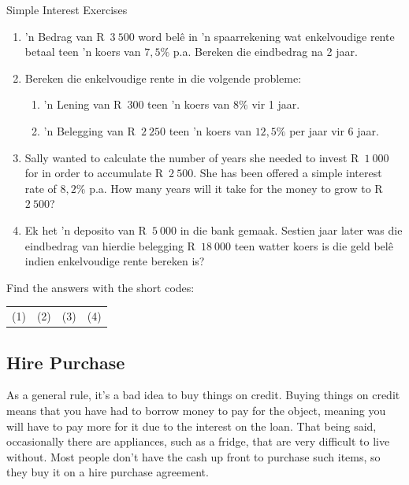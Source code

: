 \begin{exercises}{Simple Interest Exercises}
    \begin{enumerate}[label=\textbf{\arabic*}.]
	\item ’n Bedrag van R~$3~500$ word belê in ’n spaarrekening wat enkelvoudige rente betaal teen ’n koers van $7,5\%$ p.a. Bereken die eindbedrag na 2 jaar.

	\item Bereken die enkelvoudige rente in die volgende probleme:
	\begin{enumerate}
	    \item ’n Lening van R~$300$  teen ’n koers van $8\%$ vir 1 jaar.

	    \item ’n Belegging van R~$2~250$ teen ’n koers van $12,5\%$ per jaar vir 6 jaar.
	\end{enumerate}

	\item Sally wanted to calculate the number of years she needed to invest R~$1~000$ for in order to accumulate R~$2~500$. She has been offered a simple interest rate of $8,2\%$ p.a. How many years will it take for the money to grow to R~$2~500$?

	\item Ek het ’n deposito van R~$5~000$ in die bank gemaak. Sestien jaar later was die eindbedrag van hierdie
belegging R~$18~000$ teen watter koers is die geld belê indien enkelvoudige rente bereken is?\\
    \end{enumerate}

    Find the answers with the short codes:\\
    \begin{tabularx}{\textwidth}{ XXXX }
	(1)	&	(2)	&	(3)	&	(4)\\
    \end{tabularx}
\end{exercises}


\subsection{Hire Purchase}

As a general rule, it’s a bad idea to buy things on credit. Buying things on credit means that you have had to borrow money to pay for the object, meaning you will have to pay more for it due to the interest on the loan. That being said, occasionally there are appliances, such as a fridge, that are very difficult to live without. Most people don’t have the cash up front to purchase such items, so they buy it on a hire purchase agreement.\par

